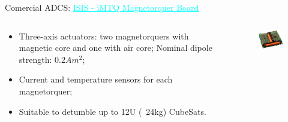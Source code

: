 \begin{frame}{Comercial ADCS: \href{https://www.isispace.nl/product/isis-magnetorquer-board/}{\textcolor{cyan}{\underline{ISIS - iMTQ Magnetorquer Board}}}}

    \begin{columns}[t]
        \begin{column}[t]{0.5\textwidth}
            \begin{itemize}
                \item Three-axis actuators: two magnetorquers with magnetic core and one with air core; Nominal dipole strength: $0.2 Am^2$;
                \item Current and temperature sensors for each magnetorquer;
                \item Suitable to detumble up to 12U (~24kg) CubeSats.
            \end{itemize}
        \end{column}
        \begin{column}[t]{0.5\textwidth}
            \begin{figure}[!ht]
                \begin{center}
                    \includegraphics[width=4.5cm]{figures/magnetorquers-isis.png}
                \end{center}
            \end{figure}
        \end{column}
    \end{columns}

    

    
\end{frame}

